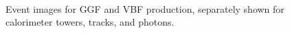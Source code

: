 \documentclass[12pt]{article}
\begin{document}
\begin{figure}[htpb]
{            } \\
            \caption{Event images for GGF and VBF production, separately shown for calorimeter towers, tracks, and photons.}
            \label{fig:GGF_VEF_event_image}
        \end{figure}
\end{document}
